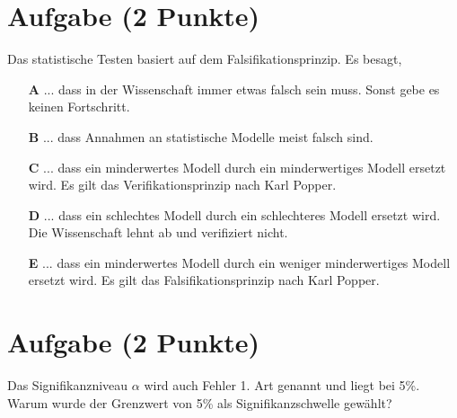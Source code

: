 \documentclass[a4paper, 9pt]{scrartcl}\usepackage[]{graphicx}\usepackage[]{xcolor}
\begin{document}
\section{Aufgabe \hfill (2 Punkte)}



Das statistische Testen basiert auf dem Falsifikationsprinzip. Es besagt,



\begin{enumerate}
\item [\textbf{A} \msquare] ... dass in der Wissenschaft immer etwas falsch sein muss. Sonst gebe es keinen Fortschritt.
\item [\textbf{B} \msquare] ... dass Annahmen an statistische Modelle meist falsch sind.
\item [\textbf{C} \msquare] ... dass ein minderwertes Modell durch ein minderwertiges Modell ersetzt wird. Es gilt das Verifikationsprinzip nach Karl Popper.
\item [\textbf{D} \msquare] ... dass ein schlechtes Modell durch ein schlechteres Modell ersetzt wird. Die Wissenschaft lehnt ab und verifiziert nicht.
\item [\textbf{E} \msquare] ... dass ein minderwertes Modell durch ein weniger minderwertiges Modell ersetzt wird. Es gilt das Falsifikationsprinzip nach Karl Popper.
\end{enumerate}

\section{Aufgabe \hfill (2 Punkte)}



Das Signifikanzniveau $\alpha$ wird auch Fehler 1. Art genannt und liegt bei 5\%. Warum wurde der Grenzwert von 5\% als Signifikanzschwelle gewählt?
\end{document}
